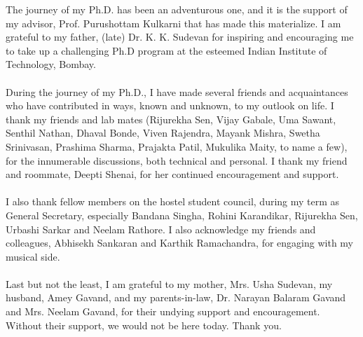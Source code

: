 The journey of my Ph.D. has been an adventurous one, and it is the support of
my advisor, Prof. Purushottam Kulkarni that has made this materialize. I
am grateful to my father, (late) Dr. K. K. Sudevan for inspiring and
encouraging me to take up a challenging Ph.D program at the esteemed
Indian Institute of Technology, Bombay. 
\\
\\
During the journey of my Ph.D., I have made several friends and 
acquaintances who have contributed in ways, known and unknown, 
to my outlook on life. 
I thank my friends and lab mates (Rijurekha Sen, Vijay Gabale,
Uma Sawant, Senthil Nathan, Dhaval Bonde, Viven Rajendra,
Mayank Mishra, Swetha Srinivasan, Prashima Sharma,
Prajakta Patil, Mukulika Maity, to name a few),
for the innumerable discussions, both technical and personal.
I thank my friend and roommate, Deepti Shenai, for her continued
encouragement and support. 
\\
\\
I also thank fellow members on the hostel student council,
during my term as General Secretary, especially Bandana Singha,
Rohini Karandikar, Rijurekha Sen, Urbashi Sarkar and Neelam Rathore.
I also acknowledge my friends and
colleagues, Abhisekh Sankaran and Karthik Ramachandra, for
engaging with my musical side.
\\
\\
Last but not the least, I am grateful to my mother, Mrs. Usha Sudevan, 
my husband, Amey Gavand, and my
parents-in-law, Dr. Narayan Balaram Gavand and Mrs. Neelam Gavand,
for their undying support and encouragement. Without their support,
we would not be here today. Thank you.
